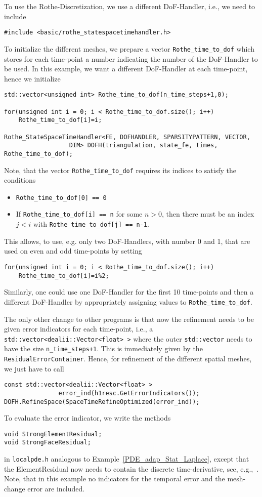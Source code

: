 To use the Rothe-Discretization, we use a different DoF-Handler, i.e.,
we need to include
\begin{verbatim}
#include <basic/rothe_statespacetimehandler.h>
\end{verbatim}
To initialize the different meshes, we prepare a vector
\texttt{Rothe\_time\_to\_dof} which stores for each time-point a number
indicating the number of the DoF-Handler to be used. In this example,
we want a different DoF-Handler at each time-point, hence we
initialize
\begin{verbatim}
std::vector<unsigned int> Rothe_time_to_dof(n_time_steps+1,0);

for(unsigned int i = 0; i < Rothe_time_to_dof.size(); i++)
    Rothe_time_to_dof[i]=i;

Rothe_StateSpaceTimeHandler<FE, DOFHANDLER, SPARSITYPATTERN, VECTOR,
			      DIM> DOFH(triangulation, state_fe, times, Rothe_time_to_dof);
\end{verbatim}
Note, that the vector \texttt{Rothe\_time\_to\_dof} requires its indices
to satisfy the conditions
\begin{itemize}
\item \verb|Rothe_time_to_dof[0] == 0|
\item If \verb|Rothe_time_to_dof[i] == n| for some $n > 0$, then there
  must be an index $j < i$ with \verb|Rothe_time_to_dof[j] == n-1|. 
\end{itemize}
This allows, to use, e.g. only two DoF-Handlers, with number 0 and 1,
that are used on even and odd time-points by setting 
\begin{verbatim}
for(unsigned int i = 0; i < Rothe_time_to_dof.size(); i++)
    Rothe_time_to_dof[i]=i%2;
\end{verbatim}
Similarly, one could use one DoF-Handler for the first 10 time-points
and then a different DoF-Handler by appropriately assigning values to \texttt{Rothe\_time\_to\_dof}.

The only other change to other programs is that now the refinement
needs to be given error indicators for each time-point, i.e., a
\verb|std::vector<dealii::Vector<float> >| where the outer
\texttt{std::vector} needs to have the size \texttt{n\_time\_steps+1}.
This is immediately given by the
\texttt{ResidualErrorContainer}. Hence, for refinement of the
different spatial meshes, we just have to call
\begin{verbatim}
const std::vector<dealii::Vector<float> > 
               error_ind(h1resc.GetErrorIndicators());
DOFH.RefineSpace(SpaceTimeRefineOptimized(error_ind));
\end{verbatim}

To evaluate the error indicator, we write the methods
\begin{verbatim}
void StrongElementResidual;
void StrongFaceResidual;
\end{verbatim}
in \texttt{localpde.h} analogous to
Example~\ref{PDE_adap_Stat_Laplace},
except that the ElementResidual now needs to contain the
discrete time-derivative, see, e.g.,~\cite{Verfuehrt:2003}.
Note, that in this example no indicators for the temporal error and
the mesh-change error are included.
